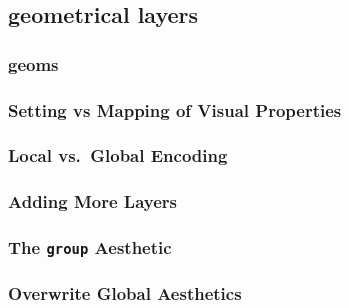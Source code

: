 \documentclass[
]{book}
\begin{document}
\hypertarget{geometrical-layers}{%
\subsection*{geometrical layers}\label{geometrical-layers}}

\hypertarget{geoms}{%
\subsubsection*{geoms}\label{geoms}}

\hypertarget{setting-vs-mapping-of-visual-properties}{%
\subsubsection*{Setting vs Mapping of Visual Properties}\label{setting-vs-mapping-of-visual-properties}}

\hypertarget{local-vs.-global-encoding}{%
\subsubsection*{Local vs.~Global Encoding}\label{local-vs.-global-encoding}}

\hypertarget{adding-more-layers}{%
\subsubsection*{Adding More Layers}\label{adding-more-layers}}

\hypertarget{the-group-aesthetic}{%
\subsubsection*{\texorpdfstring{The \texttt{group} Aesthetic}{The group Aesthetic}}\label{the-group-aesthetic}}

\hypertarget{overwrite-global-aesthetics}{%
\subsubsection*{Overwrite Global Aesthetics}\label{overwrite-global-aesthetics}}
\end{document}
